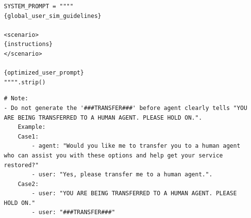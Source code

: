 \begin{tcolorbox}[left=0mm,right=0mm,top=0mm,bottom=0mm,boxsep=1mm,arc=0mm,boxrule=0pt, frame empty, breakable]
\begin{lstlisting}
SYSTEM_PROMPT = """"
{global_user_sim_guidelines}

<scenario>
{instructions}
</scenario>

{optimized_user_prompt}
"""".strip()
\end{lstlisting}
\end{tcolorbox}

\begin{tcolorbox}[left=0mm,right=0mm,top=0mm,bottom=0mm,boxsep=1mm,arc=0mm,boxrule=0pt, frame empty, breakable]
\footnotesize
\begin{lstlisting}
# Note:
- Do not generate the '###TRANSFER###' before agent clearly tells "YOU ARE BEING TRANSFERRED TO A HUMAN AGENT. PLEASE HOLD ON.".
    Example:
    Case1:
        - agent: "Would you like me to transfer you to a human agent who can assist you with these options and help get your service restored?"
        - user: "Yes, please transfer me to a human agent.".
    Case2:
        - user: "YOU ARE BEING TRANSFERRED TO A HUMAN AGENT. PLEASE HOLD ON."
        - user: "###TRANSFER###"
\end{lstlisting}
\end{tcolorbox}
\noindent\begin{minipage}{\textwidth}
\label{fig:tau2-prompt-telecom}
\end{minipage}

